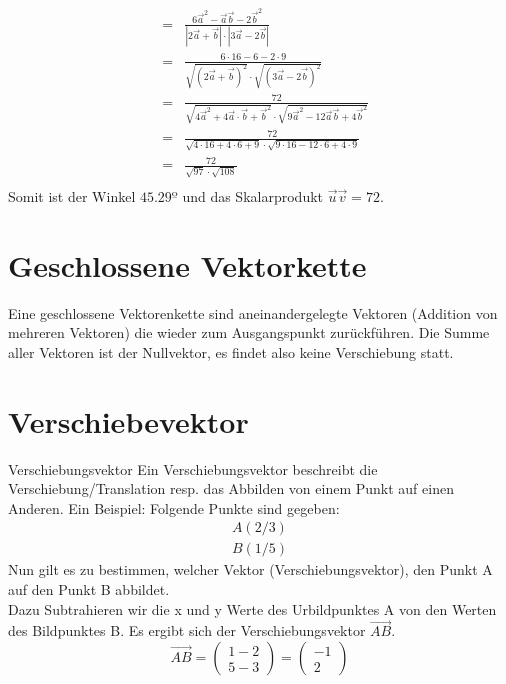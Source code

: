 \begin{enumerate}
\begin{eqnarray*}
	&=& \frac{6\vec{a}^2 - \vec{a}\vec{b}-2\vec{b}^2}{|2\vec{a} + \vec{b}| \cdot |3\vec{a}-2\vec{b}|}\\
	&=& \frac{6\cdot 16 - 6 - 2\cdot 9}{\sqrt{(2\vec{a} + \vec{b})^2}\cdot \sqrt{(3\vec{a}-2\vec{b})^2}}\\
	&=& \frac{72}{\sqrt{4\vec{a}^2+4\vec{a}\cdot\vec{b}+\vec{b}^2}\cdot\sqrt{9\vec{a}^2 - 12\vec{a}\vec{b}+4\vec{b}^2}}\\
	&=&\frac{72}{\sqrt{4\cdot 16 + 4 \cdot 6 + 9}\cdot\sqrt{9\cdot 16 - 12\cdot 6 + 4\cdot 9}}\\
	&=&\frac{72}{\sqrt{97}\cdot\sqrt{108}}\\
	\end{eqnarray*}
	Somit ist der Winkel $45.29º$ und das Skalarprodukt $\vec{u}\vec{v} = 72$.
\end{enumerate}
\newpage

\section{Geschlossene Vektorkette}
Eine geschlossene Vektorenkette sind aneinandergelegte Vektoren (Addition von mehreren Vektoren) die wieder zum Ausgangspunkt zurückführen. Die Summe aller Vektoren ist der Nullvektor, es findet also keine Verschiebung statt.

\section{Verschiebevektor}
Verschiebungsvektor
Ein Verschiebungsvektor beschreibt die Verschiebung/Translation resp. das Abbilden von einem Punkt auf einen Anderen.
Ein Beispiel:
Folgende Punkte sind gegeben:
\begin{eqnarray*}
	A(2/3)\\
	B(1/5)
\end{eqnarray*}
Nun gilt es zu bestimmen, welcher Vektor (Verschiebungsvektor), den Punkt A auf den Punkt B abbildet.\\
Dazu Subtrahieren wir die x und y Werte des Urbildpunktes A von den Werten des Bildpunktes B.
Es ergibt sich der Verschiebungsvektor  $\vec{AB}$.\\
\begin{equation*}
	\vec{AB} =  \begin{pmatrix}1-2\\5-3\end{pmatrix} = \begin{pmatrix}-1\\2\end{pmatrix} 
\end{equation*}


